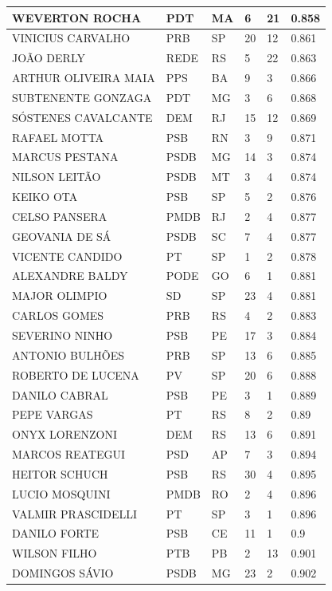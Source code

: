 \begin{apendicesenv}
\begin{longtable}{|L{4cm}|C{2cm}|C{1cm}|C{2cm}|C{1cm}|C{2cm}|}
WEVERTON ROCHA & PDT & MA & 6 & 21 & 0.858 \\ \hline
VINICIUS CARVALHO & PRB & SP & 20 & 12 & 0.861 \\ \hline
JOÃO DERLY & REDE & RS & 5 & 22 & 0.863 \\ \hline
ARTHUR OLIVEIRA MAIA & PPS & BA & 9 & 3 & 0.866 \\ \hline
SUBTENENTE GONZAGA & PDT & MG & 3 & 6 & 0.868 \\ \hline
SÓSTENES CAVALCANTE & DEM & RJ & 15 & 12 & 0.869 \\ \hline
RAFAEL MOTTA & PSB & RN & 3 & 9 & 0.871 \\ \hline
MARCUS PESTANA & PSDB & MG & 14 & 3 & 0.874 \\ \hline
NILSON LEITÃO & PSDB & MT & 3 & 4 & 0.874 \\ \hline
KEIKO OTA & PSB & SP & 5 & 2 & 0.876 \\ \hline
CELSO PANSERA & PMDB & RJ & 2 & 4 & 0.877 \\ \hline
GEOVANIA DE SÁ & PSDB & SC & 7 & 4 & 0.877 \\ \hline
VICENTE CANDIDO & PT & SP & 1 & 2 & 0.878 \\ \hline
ALEXANDRE BALDY & PODE & GO & 6 & 1 & 0.881 \\ \hline
MAJOR OLIMPIO & SD & SP & 23 & 4 & 0.881 \\ \hline
CARLOS GOMES & PRB & RS & 4 & 2 & 0.883 \\ \hline
SEVERINO NINHO & PSB & PE & 17 & 3 & 0.884 \\ \hline
ANTONIO BULHÕES & PRB & SP & 13 & 6 & 0.885 \\ \hline
ROBERTO DE LUCENA & PV & SP & 20 & 6 & 0.888 \\ \hline
DANILO CABRAL & PSB & PE & 3 & 1 & 0.889 \\ \hline
PEPE VARGAS & PT & RS & 8 & 2 & 0.89 \\ \hline
ONYX LORENZONI & DEM & RS & 13 & 6 & 0.891 \\ \hline
MARCOS REATEGUI & PSD & AP & 7 & 3 & 0.894 \\ \hline
HEITOR SCHUCH & PSB & RS & 30 & 4 & 0.895 \\ \hline
LUCIO MOSQUINI & PMDB & RO & 2 & 4 & 0.896 \\ \hline
VALMIR PRASCIDELLI & PT & SP & 3 & 1 & 0.896 \\ \hline
DANILO FORTE & PSB & CE & 11 & 1 & 0.9 \\ \hline
WILSON FILHO & PTB & PB & 2 & 13 & 0.901 \\ \hline
DOMINGOS SÁVIO & PSDB & MG & 23 & 2 & 0.902 \\ \hline

\end{longtable}
\end{apendicesenv}
